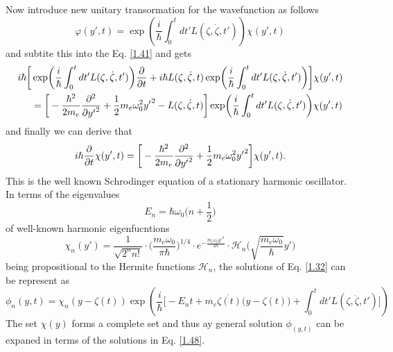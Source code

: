 \documentclass[a4paper]{article}
\numberwithin{equation}{subsection}
\numberwithin{equation}{section}
\begin{document}
\noindent
Now introduce new unitary transormation for the wavefunction as follows
\begin{equation} \label{1.43}
    \varphi(y',t) = \exp(\frac{i}{\hbar}\int_0^{t}dt'L(\zeta,\dot{\zeta},t')) \chi(y',t)
\end{equation}
and subtite this into the Eq. \eqref{1.41} and gets
\begin{equation} \label{1.44}
  \begin{aligned}
    i \hbar \bigg[
      & \exp(\frac{i}{\hbar}\int_0^{t}dt'L(\zeta,\dot{\zeta},t')) \pdv{t}
      +
      i \hbar L(\zeta,\dot{\zeta},t) \exp(\frac{i}{\hbar}\int_0^{t}dt'L(\zeta,\dot{\zeta},t'))
    \bigg]\chi(y',t) \\
    & =
    \bigg[
        -  \frac{\hbar^2}{2m_e}\pdv[2]{{y'}}
        + \frac{1}{2} m_e \omega_0^2 {y'}^2
        - L(\zeta,\dot{\zeta},t)
    \bigg] \exp(\frac{i}{\hbar}\int_0^{t}dt'L(\zeta,\dot{\zeta},t')) \chi(y',t)
  \end{aligned}
\end{equation}
and finally we can derive that
\begin{equation} \label{1.45}
  \begin{aligned}
    i \hbar \pdv{t} \chi(y',t)  =
    \bigg[
        -  \frac{\hbar^2}{2m_e}\pdv[2]{{y'}}
        + \frac{1}{2} m_e \omega_0^2 {y'}^2
    \bigg] \chi(y',t).
  \end{aligned}
\end{equation}
This is the well known Schrodinger equation of a stationary harmonic oscillator.
In terms of the eigenvalues
\begin{equation} \label{1.46}
  E_n = \hbar \omega_0 \big(n + \frac{1}{2}\big)
\end{equation}
of well-known harmonic eigenfucntions
\begin{equation} \label{1.47}
  \chi_n(y') = \frac{1}{\sqrt{2^{n}n!}}  \cdot
  \bigg(\frac{m_e\omega_0}{\pi \hbar}\bigg)^{1/4}
  \cdot e^{-\frac{m_e\omega_0 y'^2}{2\hbar}} \cdot
  \mathcal{H}_n \bigg(\sqrt{\frac{m_e \omega_0}{\hbar}}y'\bigg)
\end{equation}
being propositional to the Hermite functions $\mathcal{H}_n$, the solutions of Eq. \eqref{1.32} can be represent as
\begin{equation} \label{1.48}
  \phi_n(y,t) = \chi_n(y - \zeta(t))
  \exp(\frac{i}{\hbar}\bigg[- E_nt +
  m_e\dot{\zeta(t)}\big(y-\zeta(t)\big)
   + \int_0^{t}dt'L(\zeta,\dot{\zeta},t')\bigg])
\end{equation}
The set $\chi(y)$ forms a complete set and thus ay general solution $\phi_(y,t)$ can be expaned in terms of the solutions in Eq. \eqref{1.48}.
\end{document}

